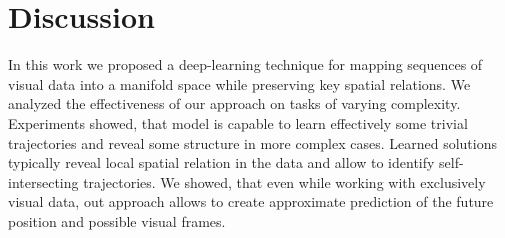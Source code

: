 
\chapter{Discussion}
\label{ch:conc}

In this work we proposed a deep-learning technique for mapping sequences of visual data into a manifold space while preserving key spatial relations. We analyzed the effectiveness of our approach on tasks of varying complexity. Experiments showed, that model is capable to learn effectively some trivial trajectories and reveal some structure in more complex cases. Learned solutions typically reveal local spatial relation in the data and allow to identify self-intersecting trajectories. We showed, that even while working with exclusively visual data, out approach allows to create approximate prediction of the future position and possible visual frames.    

